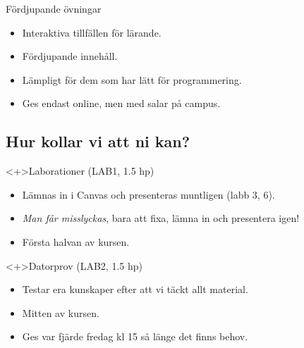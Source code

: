 \begin{frame}
  \begin{block}{Fördjupande övningar}
    \begin{itemize}
      \item Interaktiva tillfällen för lärande.
      \item Fördjupande innehåll.
      \item Lämpligt för dem som har lätt för programmering.
      \item Ges endast online, men med salar på campus.
    \end{itemize}
  \end{block}
\end{frame}


\subsection{Hur kollar vi att ni kan?}

\begin{frame}
  \begin{block}<+>{Laborationer (LAB1, 1.5 hp)}
    \begin{itemize}
      \item Lämnas in i Canvas och presenteras muntligen (labb 3, 6).
      \item \emph{Man får misslyckas}, bara att fixa, lämna in och presentera 
        igen!
      \item Första halvan av kursen.
    \end{itemize}
  \end{block}

  \begin{block}<+>{Datorprov (LAB2, 1.5 hp)}
    \begin{itemize}
      \item Testar era kunskaper efter att vi täckt allt material.
      \item Mitten av kursen.
      \item Ges var fjärde fredag kl 15 så länge det finns behov.
    \end{itemize}
  \end{block}
\end{frame}

